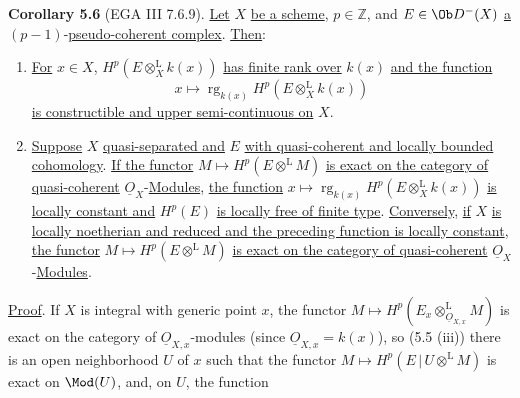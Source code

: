 \textbf{Corollary 5.6} (EGA III 7.6.9). \uline{Let} \(X\) \uline{be a scheme}, \(p\in\mathbb Z\), and \(E\in\Ob D^{-}(X)\) \uline{a} \((p-1)\)-\uline{pseudo-coherent complex}. \uline{Then}:
\begin{enumerate}[label=(\roman*)]
\item \uline{For} \(x\in X\), \(H^p(E\otimes_X^{\mathrm L}k(x))\) \uline{has finite rank over} \(k(x)\) \uline{and the function}
\[
 x\longmapsto\operatorname{rg}_{k(x)}H^p(E\otimes_X^{\mathrm L}k(x))
\]
\uline{is constructible and upper semi-continuous on} \(X\).
\item \uline{Suppose} \(X\) \uline{quasi-separated and} \(E\) \uline{with quasi-coherent and locally bounded cohomology}. \uline{If the functor} \(M\mapsto H^p(E\otimes^{\mathrm L}M)\) \uline{is exact on the category of quasi-coherent} \(\underline{O}_X\)-\uline{Modules}, \uline{the function} \(x\mapsto\operatorname{rg}_{k(x)}H^p(E\otimes_X^{\mathrm L}k(x))\) \uline{is locally constant and} \(H^p(E)\) \uline{is locally free of finite type}. \uline{Conversely}, \uline{if} \(X\) \uline{is locally noetherian and reduced and the preceding function is locally constant}, \uline{the functor} \(M\mapsto H^p(E\otimes^{\mathrm L}M)\) \uline{is exact on the category of quasi-coherent} \(\underline{O}_X\)-\uline{Modules}.
\end{enumerate}

\uline{Proof}. If \(X\) is integral with generic point \(x\), the functor \(M\mapsto H^p(E_x\otimes_{\underline{O}_{X,x}}^{\mathrm L}M)\) is exact on the category of \(\underline{O}_{X,x}\)-modules (since \(\underline{O}_{X,x}=k(x)\)), so (5.5 (iii)) there is an open neighborhood \(U\) of \(x\) such that the functor \(M\mapsto H^p(E\,|\,U\otimes^{\mathrm L}M)\) is exact on \(\Mod(U)\), and, on \(U\), the function
